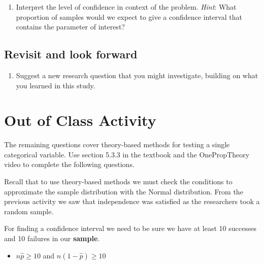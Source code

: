 \documentclass[
]{report}
\providecommand{\tightlist}{%
  \setlength{\itemsep}{0pt}\setlength{\parskip}{0pt}}
\begin{document}
\vspace{0.5in}

\begin{enumerate}
\def\labelenumi{\arabic{enumi}.}
\setcounter{enumi}{17}
\tightlist
\item
  Interpret the level of confidence in context of the problem. \emph{Hint}: What proportion of samples would we expect to give a confidence interval that contains the parameter of interest?
\end{enumerate}

\vspace{1in}

\hypertarget{revisit-and-look-forward}{%
\subsection*{Revisit and look forward}\label{revisit-and-look-forward}}

\begin{enumerate}
\def\labelenumi{\arabic{enumi}.}
\setcounter{enumi}{18}
\tightlist
\item
  Suggest a new research question that you might investigate, building on what you learned in this study.
\end{enumerate}

\vspace{.6in}

\newpage

\hypertarget{out-of-class-activity}{%
\section{Out of Class Activity}\label{out-of-class-activity}}

The remaining questions cover theory-based methods for testing a single categorical variable. Use section 5.3.3 in the textbook and the OnePropTheory video to complete the following questions.

Recall that to use theory-based methods we must check the conditions to approximate the sample distribution with the Normal distribution. From the previous activity we saw that independence was satisfied as the researchers took a random sample.

For finding a confidence interval we need to be sure we have at least 10 successes and 10 failures in our \textbf{sample}.

\begin{itemize}
\tightlist
\item
  \(n\hat{p}≥10\) and \(n(1-\hat{p})≥10\)
\end{itemize}
\end{document}

